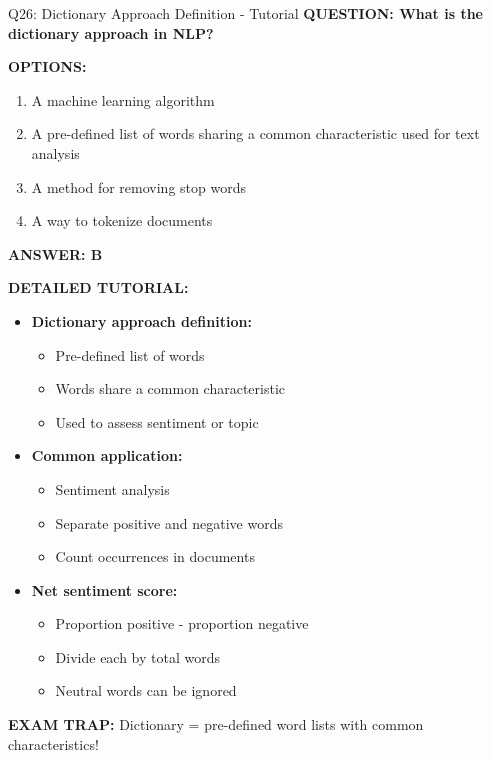 \documentclass[8pt]{beamer}
\begin{document}
	
	\begin{frame}{Q26: Dictionary Approach Definition - Tutorial}
		\fontsize{6.5}{7.5}\selectfont
		\textbf{QUESTION: What is the dictionary approach in NLP?}
		
		\vspace{0.1cm}
		\textbf{OPTIONS:}
		\begin{enumerate}
			\item A machine learning algorithm
			\item A pre-defined list of words sharing a common characteristic used for text analysis
			\item A method for removing stop words
			\item A way to tokenize documents
		\end{enumerate}
		
		\vspace{0.1cm}
		\textcolor{myblue}{\textbf{ANSWER: B}}
		
		\vspace{0.1cm}
		\textbf{DETAILED TUTORIAL:}
		\begin{itemize}
			\item \textbf{Dictionary approach definition:}
			\begin{itemize}
				\item Pre-defined list of words
				\item Words share a common characteristic
				\item Used to assess sentiment or topic
			\end{itemize}
			\item \textbf{Common application:}
			\begin{itemize}
				\item Sentiment analysis
				\item Separate positive and negative words
				\item Count occurrences in documents
			\end{itemize}
			\item \textbf{Net sentiment score:}
			\begin{itemize}
				\item Proportion positive - proportion negative
				\item Divide each by total words
				\item Neutral words can be ignored
			\end{itemize}
		\end{itemize}
		
		\textcolor{myred}{\textbf{EXAM TRAP:}} Dictionary = \textcolor{myblue}{pre-defined word lists with common characteristics}!
	\end{frame}
	
\end{document}
